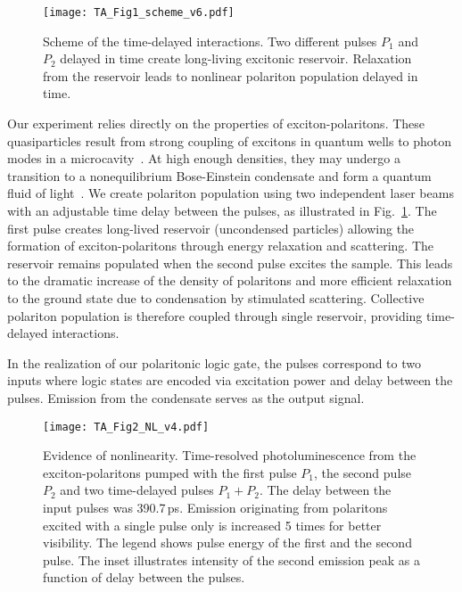 \documentclass[
 print,
 amsmath,amssymb,
 aps,
]{revtex4-2}
\begin{document}
	\begin{figure}[ht!]
		\centering
		\texttt{[image: TA\_Fig1\_scheme\_v6.pdf]}
		\caption{Scheme of the time-delayed interactions. Two different pulses $P_1$ and $P_2$ delayed in time create long-living excitonic reservoir. Relaxation from the reservoir leads to nonlinear polariton population delayed in time.}
		\label{im:scheme}
	\end{figure}

	Our experiment relies directly on the properties of exciton-polaritons. These quasiparticles result from strong coupling of excitons in quantum wells to photon modes in a microcavity~\cite{Kavokin_book}. At high enough densities, they may undergo a transition to a nonequilibrium Bose-Einstein condensate and form a quantum fluid of light~\cite{Carusotto_QuantumFluids}. We create polariton population using two independent laser beams with an adjustable time delay between the pulses, as illustrated in Fig.~\ref{im:scheme}. The first pulse creates long-lived reservoir (uncondensed particles) allowing the formation of exciton-polaritons through energy relaxation and scattering. The reservoir remains populated when the second pulse excites the sample. This leads to the dramatic increase of the density of polaritons and more efficient relaxation to the ground state due to condensation by stimulated scattering. Collective polariton population is therefore coupled through single reservoir, providing time-delayed interactions. 
	
	In the realization of our polaritonic logic gate, the pulses correspond to two inputs where logic states are encoded via excitation power and delay between the pulses. Emission from the condensate serves as the output signal. 

	
	\begin{figure}[t!]
		\centering
		\texttt{[image: TA\_Fig2\_NL\_v4.pdf]}
		\caption{Evidence of nonlinearity. Time-resolved photoluminescence from the exciton-polaritons pumped with the first pulse $P_1$, the second pulse $P_2$ and two time-delayed pulses $P_1+P_2$. The delay between the input pulses was 390.7\,ps. Emission originating from polaritons excited with a single pulse only is increased 5 times for better visibility. The legend shows pulse energy of the first and the second pulse. The inset illustrates intensity of the second emission peak as a function of delay between the pulses.}
		\label{im:NL}
	\end{figure}
\end{document}
